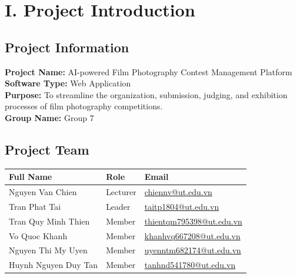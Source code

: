 \section*{I. Project Introduction}
\setcounter{section}{1}
\renewcommand{\thesubsection}{\arabic{subsection}}
\setcounter{subsection}{0}
\subsection{Project Information}
\label{subsec:project_information}

\textbf{Project Name:} AI-powered Film Photography Contest Management Platform\\
\textbf{Software Type:} Web Application\\
\textbf{Purpose:} To streamline the organization, submission, judging, and exhibition processes of film photography competitions.\\
\textbf{Group Name:} Group 7

\subsection{Project Team}
\label{subsec:project_team}

\begin{tabularx}{\textwidth}{|l|l|X|}
    \hline
    \textbf{Full Name} & \textbf{Role} & \textbf{Email} \\
    \hline
    Nguyen Van Chien & Lecturer & \href{mailto:chiennv@ut.edu.vn}{chiennv@ut.edu.vn} \\
    \hline
    Tran Phat Tai & Leader & \href{mailto:taitp1804@ut.edu.vn}{taitp1804@ut.edu.vn} \\
    \hline
    Tran Quy Minh Thien & Member & \href{mailto:thientqm795398@ut.edu.vn}{thientqm795398@ut.edu.vn} \\
    \hline
    Vo Quoc Khanh & Member & \href{mailto:khanhvq667208@ut.edu.vn}{khanhvq667208@ut.edu.vn} \\
    \hline
    Nguyen Thi My Uyen & Member & \href{mailto:uyenntm682174@ut.edu.vn}{uyenntm682174@ut.edu.vn} \\
    \hline
    Huynh Nguyen Duy Tan & Member & \href{mailto:tanhnd541780@ut.edu.vn}{tanhnd541780@ut.edu.vn} \\
    \hline
\end{tabularx}

